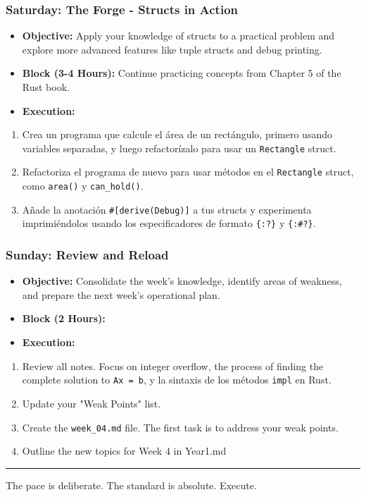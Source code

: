 \subsubsection{\textbf{Saturday: The Forge - Structs in Action}}
\begin{itemize}
  \item \textbf{Objective:} Apply your knowledge of structs to a practical problem and explore more advanced features like tuple structs and debug printing.
  \item \textbf{Block (3-4 Hours):} Continue practicing concepts from Chapter 5 of the Rust book.
  \item \textbf{Execution:}
\end{itemize}
\begin{enumerate}
  \item Crea un programa que calcule el área de un rectángulo, primero usando variables separadas, y luego refactorízalo para usar un \texttt{Rectangle} struct.
  \item Refactoriza el programa de nuevo para usar métodos en el \texttt{Rectangle} struct, como \texttt{area()} y \texttt{can\_hold()}.
  \item Añade la anotación \texttt{\#[derive(Debug)]} a tus structs y experimenta imprimiéndolos usando los especificadores de formato \texttt{\{:?\}} y \texttt{\{:\#?\}}.

\end{enumerate}
\subsubsection{\textbf{Sunday: Review and Reload}}
\begin{itemize}
  \item \textbf{Objective:} Consolidate the week's knowledge, identify areas of weakness, and prepare the next week's operational plan.
  \item \textbf{Block (2 Hours):}
  \item \textbf{Execution:}
\end{itemize}
\begin{enumerate}
  \item Review all notes. Focus on integer overflow, the process of finding the complete solution to \texttt{Ax = b}, y la sintaxis de los métodos \texttt{impl} en Rust.
  \item Update your "Weak Points" list.
  \item Create the \texttt{week\_04.md} file. The first task is to address your weak points.
  \item Outline the new topics for Week 4 in Year1.md

\end{enumerate}
\noindent\rule{\textwidth}{0.4pt}

The pace is deliberate. The standard is absolute. Execute.
